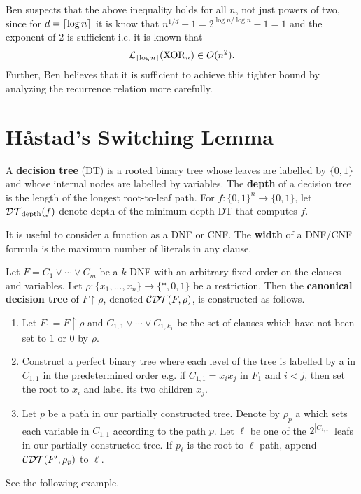 \documentclass[11pt]{article}
\begin{document}
	Ben suspects that the above inequality holds for all $n$, not just powers of two, since for $d = \lceil\log n\rceil$ it is know that $n^{1/d} - 1 = 2^{\log n/ \log n} - 1 = 1$ and the exponent of $2$ is sufficient i.e. it is known that
	\[\mathcal{L}_{\lceil\log n\rceil}(\mathrm{XOR}_n) \in O(n^2).\]
	Further, Ben believes that it is sufficient to achieve this tighter bound by analyzing the recurrence relation more carefully. 
	
	\section{H\aa stad's Switching Lemma}
	\begin{definition}
		\label{def:decisiontrees}
		A \textbf{decision tree} (DT) is a rooted binary tree whose leaves are labelled by $\{0,1\}$ and whose internal nodes are labelled by variables. The \textbf{depth} of a decision tree is the length of the longest root-to-leaf path. For $f: \{0,1\}^n \rightarrow \{0,1\}$, let $\mathcal{DT}_{\mathrm{depth}}(f)$ denote depth of the minimum depth DT that computes $f$. 
				
		It is useful to consider a function as a DNF or CNF. The \textbf{width} of a DNF/CNF formula is the maximum number of literals in any clause. 
	\end{definition}
	
	\begin{definition}
		\label{def:canonicaldecisiontree} 
		Let $F = C_1 \lor \cdots \lor C_m$ be a $k$-DNF with an arbitrary fixed order on the clauses and variables. Let $\rho: \{x_1, ..., x_n\} \rightarrow \{*, 0, 1\}$ be a restriction. Then the \textbf{canonical decision tree} of $F \upharpoonright \rho$, denoted $\mathcal{CDT}(F, \rho)$, is constructed as follows. 
		\begin{enumerate}
			\item Let $F_1 = F \upharpoonright \rho$ and $C_{1,1} \lor \cdots \lor C_{1,k_1}$ be the set of clauses which have not been set to $1$ or $0$ by $\rho$. 
			\item Construct a perfect binary tree where each level of the tree is labelled by a in $C_{1,1}$ in the predetermined order e.g. if $C_{1,1} = x_ix_j$ in $F_1$ and $i < j$, then set the root to $x_i$ and label its two children $x_j$. 
			\item Let $p$ be a path in our partially constructed tree. Denote by $\rho_{p}$ a which sets each variable in $C_{1,1}$ according to the path $p$. Let $\ell$ be one of the $2^{|C_{1,1}|}$ leafs in our partially constructed tree. If $p_{\ell}$ is the root-to-$\ell$ path, append $\mathcal{CDT}(F', \rho_{p})$ to $\ell$. 
		\end{enumerate}
		See the following example. 
	\end{definition}
	
\end{document}
